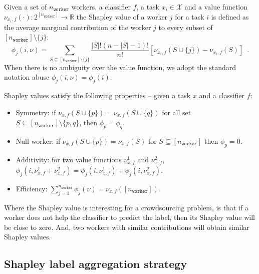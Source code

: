 \documentclass{cap2024}
\begin{document}

\begin{definition}
Given a set of $n_\texttt{worker}$ workers, a classifier $f$, a task $x_i\in\mathcal{X}$ and a value function $\nu_{x_i, f}(\cdot): 2^{[n_\texttt{worker}]}\rightarrow \mathbb{R}$ the Shapley value of a worker $j$ for a task $i$ is defined as the average marginal contribution of the worker $j$ to every subset of $[n_\texttt{worker}]\setminus\{j\}$:
\begin{equation}
  \phi_j(i, \nu) = \sum_{S\subseteq [n_\texttt{worker}]\setminus\{j\}} \frac{|S|!(n-|S|-1)!}{n!} \left[\nu_{x_i, f}(S\cup\{j\}) - \nu_{x_i, f}(S)\right]\enspace.
\end{equation}
When there is no ambiguity over the value function, we adopt the standard notation abuse $\phi_j(i, \nu)=\phi_j(i)$.
\end{definition}

Shapley values satisfy the following properties -- given a task $x$ and a classifier $f$:
\begin{itemize}
  \item Symmetry: if $\nu_{x,f}(S\cup\{p\})=\nu_{x,f}(S\cup\{q\})$ for all set $S\subseteq [n_\texttt{worker}]\setminus\{p,q\}$, then $\phi_p=\phi_q$.
  \item Null worker: if $\nu_{x,f}(S\cup\{p\})=\nu_{x,f}(S)$ for $S\subseteq [n_\texttt{worker}]$ then $\phi_p=0$.
  \item Additivity: for two value functions $\nu^1_{x,f}$ and $\nu^2_{x,f}$, $\phi_j(i,\nu^1_{x,f}+\nu^2_{x,f})=\phi_j(i, \nu^1_{x,f})+\phi_j(i, \nu^2_{x,f})$.
  \item Efficiency: $\sum_{j=1}^{n_\texttt{worker}} \phi_j(\nu)=\nu_{x,f}([n_\texttt{worker}])$.
\end{itemize}


Where the Shapley value is interesting for a crowdsourcing problem, is that if a worker does not help the classifier to predict the label, then its Shapley value will be close to zero. And, two workers with similar contributions will obtain similar Shapley values.
\subsection{Shapley label aggregation strategy}
\end{document}
